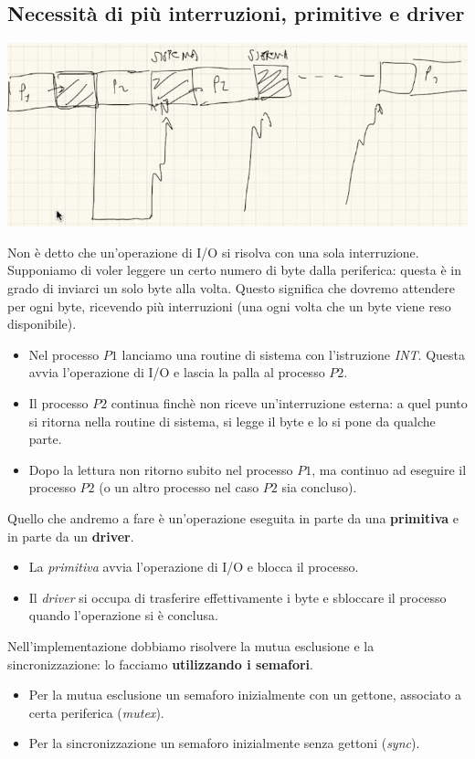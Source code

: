 \documentclass[11pt]{report}
\theoremstyle{definition}
\begin{document}
\subsection{Necessità di più interruzioni, primitive e driver}
\begin{center}
	\includegraphics[scale=.7]{img/278.PNG}
\end{center}
Non è detto che un'operazione di I/O si risolva con una sola interruzione. Supponiamo di voler leggere un certo numero di byte dalla periferica: questa è in grado di inviarci un solo byte alla volta.  Questo significa che dovremo attendere per ogni byte, ricevendo più interruzioni (una ogni volta che un byte viene reso disponibile). 
\begin{itemize}
	\item Nel processo $P1$ lanciamo una routine di sistema con l'istruzione \emph{INT}. Questa avvia l'operazione di I/O e lascia la palla al processo $P2$.
	\item Il processo $P2$ continua finchè non riceve un'interruzione esterna: a quel punto si ritorna nella routine di sistema, si legge il byte e lo si pone da qualche parte.
	\item Dopo la lettura non ritorno subito nel processo $P1$, ma continuo ad eseguire il processo $P2$ (o un altro processo nel caso $P2$ sia concluso). 
\end{itemize} 
\begin{framed}
\noindent Quello che andremo a fare è un'operazione eseguita in parte da una \textbf{primitiva} e in parte da un \textbf{driver}.
\begin{itemize}
	\item La \emph{primitiva} avvia l'operazione di I/O e blocca il processo.
	\item Il \emph{driver} si occupa di trasferire effettivamente i byte e sbloccare il processo quando l'operazione si è conclusa.
\end{itemize}
Nell'implementazione dobbiamo risolvere la mutua esclusione e la sincronizzazione: lo facciamo \textbf{utilizzando i semafori}. 
\begin{itemize}
\item Per la mutua esclusione un semaforo inizialmente con un gettone, associato a certa periferica (\emph{mutex}).
\item Per la sincronizzazione un semaforo inizialmente senza gettoni (\emph{sync}).
\end{itemize} 
\end{framed}
\end{document}
